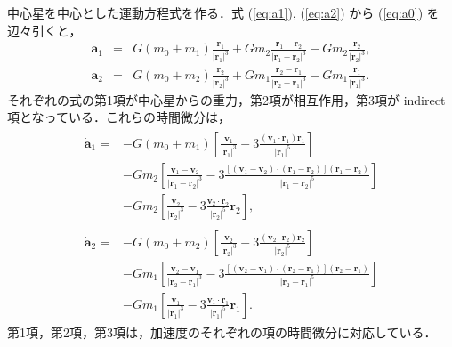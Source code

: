 \documentclass[11pt,a4paper,oneside,onecolumn]{jarticle}
\begin{document}
中心星を中心とした運動方程式を作る．式 (\ref{eq:a1}), (\ref{eq:a2}) から (\ref{eq:a0}) を辺々引くと，
\begin{eqnarray}
{\bm a}_1 & = & G (m_0 + m_1) \frac{{\bm r}_1}{|{\bm r}_1|^3} + G m_2 \frac{{\bm r}_1 - {\bm r}_2}{|{\bm r}_1 - {\bm r}_2|^3} - G m_2 \frac{{\bm r}_2}{|{\bm r}_2|^3}, \\
{\bm a}_2 & = & G (m_0 + m_2) \frac{{\bm r}_2}{|{\bm r}_2|^3} + G m_1 \frac{{\bm r}_2 - {\bm r}_1}{|{\bm r}_2 - {\bm r}_1|^3} - G m_1 \frac{{\bm r}_1}{|{\bm r}_1|^3}. 
\end{eqnarray}
それぞれの式の第1項が中心星からの重力，第2項が相互作用，第3項が indirect 項となっている．これらの時間微分は，
\begin{eqnarray}
\begin{split}
\dot{{\bm a}}_1 = & - G (m_0 + m_1) \left[ \frac{{\bm v}_1}{|{\bm r}_1|^3} - 3 \frac{({\bm v}_1 \cdot {\bm r}_1) {\bm r}_1}{|{\bm r}_1|^5} \right] \\
& - G m_2 \left[ \frac{{\bm v}_1 - {\bm v}_2}{|{\bm r}_1 - {\bm r}_2|^3} - 3 \frac{[({\bm v}_1 - {\bm v}_2) \cdot ({\bm r}_1 - {\bm r}_2)] ({\bm r}_1 - {\bm r}_2)}{|{\bm r}_1 - {\bm r}_2|^5} \right] \\
& - G m_2 \left[ \frac{{\bm v}_2}{|{\bm r}_2|^3} - 3 \frac{{\bm v}_2 \cdot {\bm r}_2}{|{\bm r}_2|^5} {\bm r}_2 \right], 
\end{split}
\\
\begin{split}
\dot{{\bm a}}_2 = & - G (m_0 + m_2) \left[ \frac{{\bm v}_2}{|{\bm r}_2|^3} - 3 \frac{({\bm v}_2 \cdot {\bm r}_2) {\bm r}_2}{|{\bm r}_2|^5} \right] \\
& - G m_1 \left[ \frac{{\bm v}_2 - {\bm v}_1}{|{\bm r}_2 - {\bm r}_1|^3} - 3 \frac{[({\bm v}_2 - {\bm v}_1) \cdot ({\bm r}_2 - {\bm r}_1)] ({\bm r}_2 - {\bm r}_1)}{|{\bm r}_2 - {\bm r}_1|^5} \right] \\
& - G m_1 \left[ \frac{{\bm v}_1}{|{\bm r}_1|^3} - 3 \frac{{\bm v}_1 \cdot {\bm r}_1}{|{\bm r}_1|^5} {\bm r}_1 \right].
\end{split}
\end{eqnarray}
第1項，第2項，第3項は，加速度のそれぞれの項の時間微分に対応している．
\end{document}
